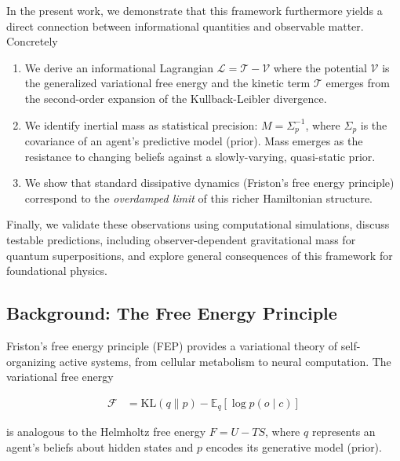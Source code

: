 \documentclass[11pt]{article}
\begin{document}
In the present work, we demonstrate that this framework furthermore yields a direct connection between informational quantities and observable matter. Concretely 

\begin{enumerate}
    \item We derive an informational Lagrangian $\mathcal{L} = \mathcal{T} - \mathcal{V}$ where the potential $\mathcal{V}$ is the generalized variational free energy and the kinetic term $\mathcal{T}$ emerges from the second-order expansion of the Kullback-Leibler divergence.
    
    
    \item We identify inertial mass as statistical precision: $M = \Sigma_p^{-1}$, where $\Sigma_p$ is the covariance of an agent's predictive model (prior). Mass emerges as the resistance to changing beliefs against a slowly-varying, quasi-static prior.
    
    \item We show that standard dissipative dynamics (Friston's free energy principle) correspond to the \emph{overdamped limit} of this richer Hamiltonian structure.
    
\end{enumerate}

Finally, we validate these observations using computational simulations, discuss testable predictions, including observer-dependent gravitational mass for quantum superpositions, and explore general consequences of this framework for foundational physics.


\subsection{Background: The Free Energy Principle}

Friston's free energy principle (FEP) \cite{Friston2010} provides a variational theory of self-organizing active systems, from cellular metabolism to neural computation. The variational free energy

\begin{equation}
\begin{aligned}
\mathcal{F} &= \mathrm{KL}(q \| p)  - \mathbb{E}_q[\log p(o \mid c)]
\end{aligned}
\end{equation}

is analogous to the Helmholtz free energy $F = U - TS$, where $q$ represents an agent's beliefs about hidden states and $p$ encodes its generative model (prior).
\end{document}
